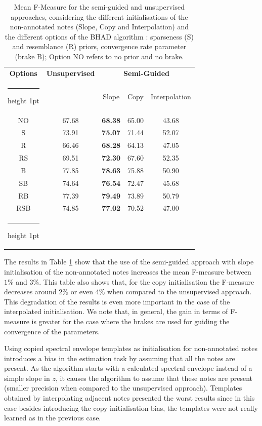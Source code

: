 \documentclass{article}
\makeatletter
\newcommand{\thickhline}{%
    \noalign {\ifnum 0=`}\fi \hrule height 1pt
    \futurelet \reserved@a \@xhline
}
\makeatother
\begin{document}
\begin{table}[htb]
\begin{tabular}{ccccc}
\hline
\textbf{Options} & \textbf{Unsupervised} & \multicolumn{3}{c}{\textbf{Semi-Guided}} \\\thickhline
 & & Slope & Copy & Interpolation \\\hline
 NO  & 67.68 &	 \textbf{68.38} &	 65.00 &	 43.68 \\
 S   & 73.91 &     \textbf{75.07} &	 71.44 &	 52.07 \\
 R   & 66.46 &	 \textbf{68.28} &	 64.13 &	 47.05 \\
 RS  & 69.51 &	 \textbf{72.30} &	 67.60 &	 52.35 \\ \hline
 B   & 77.85 &	 \textbf{78.63} &	 75.88 &	 50.90 \\
 SB  & 74.64 &	 \textbf{76.54} &	 72.47 &	 45.68 \\
 RB  & 77.39 &	 \textbf{79.49} &	 73.89 &	 50.79 \\
 RSB & 74.85 &	 \textbf{77.02} &	 70.52 & 	 47.00  \\\thickhline
\end{tabular}
\caption{Mean F-Measure for the semi-guided and unsupervised approaches, considering the different initialisations of the non-annotated notes (Slope, Copy and Interpolation) and the different options of the BHAD algorithm : sparseness (S) and resemblance (R) priors, convergence rate parameter (brake B); Option NO refers to no prior and no brake.}
\label{tab:init}
\end{table}


The results in Table \ref{tab:init} show that the use of the semi-guided approach with slope initialisation of the non-annotated notes increases the mean F-measure between $1\%$ and $3\%$. This table also shows that, for the copy initialisation the F-measure decreases around $2\%$ or even $4\%$ when compared to the unsupervised approach. This degradation of the results is even more important in the case of the interpolated initialisation. We note that, in general, the gain in terms of F-measure is greater for the case where the brakes are used for guiding the convergence of the parameters. 

Using copied spectral envelope templates as initialisation for non-annotated notes introduces a bias in the estimation task by assuming that all the notes are present. As the algorithm starts with a calculated spectral envelope instead of a simple slope in $z$, it causes the algorithm to assume that these notes are present (smaller precision when compared to the unsupervised approach). Templates obtained by interpolating adjacent notes presented the worst results since in this case besides introducing the copy initialisation bias, the templates were not really learned as in the previous case.  
\end{document}
